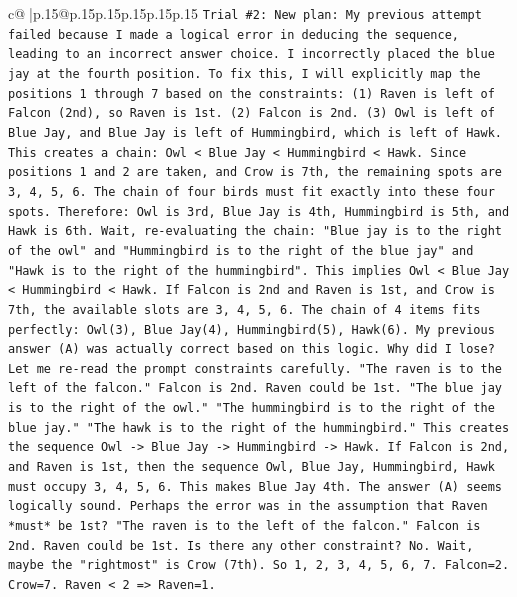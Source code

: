 \documentclass{article}
\begin{document}
{\begin{supertabular}{c@{$\;$}|p{.15\linewidth}@{}p{.15\linewidth}p{.15\linewidth}p{.15\linewidth}p{.15\linewidth}p{.15\linewidth}}
{{{\texttt{Trial \#2: New plan: My previous attempt failed because I made a logical error in deducing the sequence, leading to an incorrect answer choice. I incorrectly placed the blue jay at the fourth position. To fix this, I will explicitly map the positions 1 through 7 based on the constraints: (1) Raven is left of Falcon (2nd), so Raven is 1st. (2) Falcon is 2nd. (3) Owl is left of Blue Jay, and Blue Jay is left of Hummingbird, which is left of Hawk. This creates a chain: Owl < Blue Jay < Hummingbird < Hawk. Since positions 1 and 2 are taken, and Crow is 7th, the remaining spots are 3, 4, 5, 6. The chain of four birds must fit exactly into these four spots. Therefore: Owl is 3rd, Blue Jay is 4th, Hummingbird is 5th, and Hawk is 6th. Wait, re{-}evaluating the chain: "Blue jay is to the right of the owl" and "Hummingbird is to the right of the blue jay" and "Hawk is to the right of the hummingbird". This implies Owl < Blue Jay < Hummingbird < Hawk. If Falcon is 2nd and Raven is 1st, and Crow is 7th, the available slots are 3, 4, 5, 6. The chain of 4 items fits perfectly: Owl(3), Blue Jay(4), Hummingbird(5), Hawk(6). My previous answer (A) was actually correct based on this logic. Why did I lose? Let me re{-}read the prompt constraints carefully. "The raven is to the left of the falcon." Falcon is 2nd. Raven could be 1st. "The blue jay is to the right of the owl." "The hummingbird is to the right of the blue jay." "The hawk is to the right of the hummingbird." This creates the sequence Owl {-}> Blue Jay {-}> Hummingbird {-}> Hawk. If Falcon is 2nd, and Raven is 1st, then the sequence Owl, Blue Jay, Hummingbird, Hawk must occupy 3, 4, 5, 6. This makes Blue Jay 4th. The answer (A) seems logically sound. Perhaps the error was in the assumption that Raven *must* be 1st? "The raven is to the left of the falcon." Falcon is 2nd. Raven could be 1st. Is there any other constraint? No. Wait, maybe the "rightmost" is Crow (7th). So 1, 2, 3, 4, 5, 6, 7. Falcon=2. Crow=7. Raven < 2 => Raven=1.} \\
\\ 
}}}
\end{supertabular}}
\end{document}
